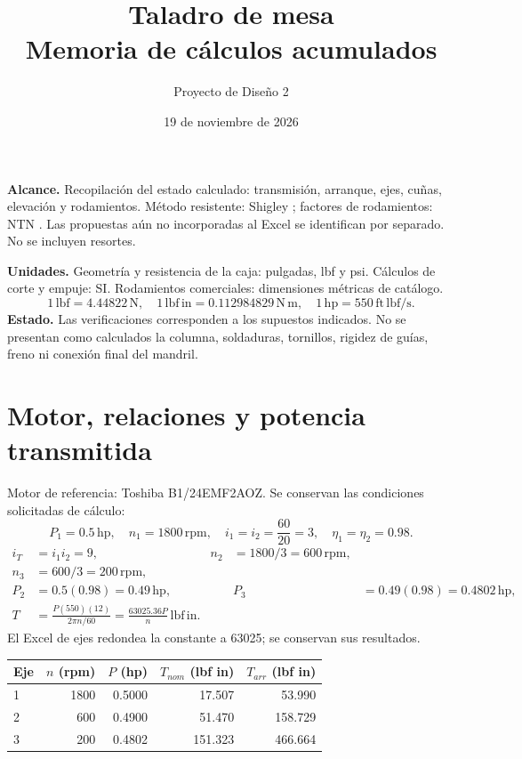 \documentclass[11pt,a4paper]{article}
\title{Taladro de mesa\\Memoria de cálculos acumulados}
\author{Proyecto de Diseño 2}
\date{19 de noviembre de 2026}
\newcommand{\lbin}{\,\mathrm{lbf\,in}}
\newcommand{\lbf}{\,\mathrm{lbf}}
\newcommand{\rpm}{\,\mathrm{rpm}}
\begin{document}
\maketitle
\textbf{Alcance.} Recopilación del estado calculado: transmisión, arranque, ejes, cuñas, elevación y rodamientos. Método resistente: Shigley \cite{shigley}; factores de rodamientos: NTN \cite{ntn}. Las propuestas aún no incorporadas al Excel se identifican por separado. No se incluyen resortes.

\textbf{Unidades.} Geometría y resistencia de la caja: pulgadas, lbf y psi. Cálculos de corte y empuje: SI. Rodamientos comerciales: dimensiones métricas de catálogo.
\[
1\lbf=4.44822\,\mathrm{N},\quad
1\lbin=0.112984829\,\mathrm{N\,m},\quad
1\,\mathrm{hp}=550\,\mathrm{ft\,lbf/s}.
\]
\textbf{Estado.} Las verificaciones corresponden a los supuestos indicados. No se presentan como calculados la columna, soldaduras, tornillos, rigidez de guías, freno ni conexión final del mandril.
\tableofcontents
\clearpage
\section{Motor, relaciones y potencia transmitida}
Motor de referencia: Toshiba B1/24EMF2AOZ. Se conservan las condiciones solicitadas de cálculo:
\[
P_1=0.5\,\mathrm{hp},\quad n_1=1800\rpm,\quad
i_1=i_2=\frac{60}{20}=3,\quad\eta_1=\eta_2=0.98.
\]
\begin{align*}
i_T&=i_1i_2=9, & n_2&=1800/3=600\rpm,\\
n_3&=600/3=200\rpm,\\
P_2&=0.5(0.98)=0.49\,\mathrm{hp},&&P_3&=0.49(0.98)=0.4802\,\mathrm{hp},\\
T&=\frac{P(550)(12)}{2\pi n/60}=\frac{63025.36P}{n}\lbin.
\end{align*}
El Excel de ejes redondea la constante a 63025; se conservan sus resultados.

\begin{center}\small\begin{tabular}{lrrrr}\toprule

Eje & $n$ (rpm) & $P$ (hp) & $T_{nom}$ (lbf in) & $T_{arr}$ (lbf in) \\ \midrule

1 & 1800 & 0.5000 & 17.507 & 53.990 \\

2 & 600 & 0.4900 & 51.470 & 158.729 \\

3 & 200 & 0.4802 & 151.323 & 466.664 \\

\bottomrule\end{tabular}\end{center}
\end{document}
